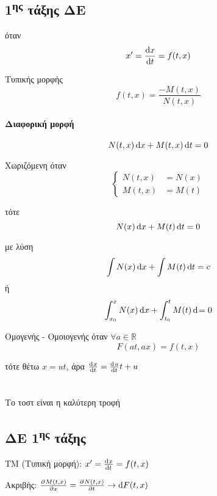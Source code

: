 \documentclass[11pt,a4paper,titlepage,draft]{article}
\begin{document}
\subsection{1\textsuperscript{ης} τάξης ΔΕ}
\begin{defn}{}{}
όταν
\[
x' = \frac{\dif x}{\dif t} = f(t,x)
\]

\begin{defn}{Τυπικής μορφής}{}
\[
f(t,x) = \frac{-M(t,x)}{N(t,x)}
\]

\paragraph{Διαφορική μορφή}
\[N(t,x) \dif x + M(t,x) \dif t = 0 \]

\begin{defn}{Χωριζόμενη}{}
όταν
\[
\begin{cases}
N(t,x) &= N(x) \\
M(t,x) &= M(t)
\end{cases}
\]

τότε
\[
N(x) \dif x + M(t) \dif t = 0
\]

με λύση
\[
\int N(x) \dif x + \int M(t) \dif t = c
\]
ή
\[
\int_{x_0}^x N(x) \dif x + \int_{t_0}^t M(t) \dif = 0
\]
\end{defn}

\begin{defn}{Ομογενής - Ομοιογενής}{}
όταν \(\forall a \in  \mathbb R\)
\[
F(at,ax)=f(t,x)
\]

τότε θέτω \(x = ut\), άρα \(\od{x}{t}=\od{u}{t}t+u\)
\end{defn}


\end{defn}
\end{defn}


\section{}


Το τοστ είναι η καλύτερη τροφή


\subsection{ΔΕ 1\textsuperscript{ης} τάξης}
ΤΜ (Τυπική μορφή): \(x' = \od{x}{t} = f(t,x)\)


Ακριβής: \(
\pd{M(t,x)}{x}=\pd{N(t,x)}{t} \rightarrow \dif F(t,x)
\)
\end{document}
